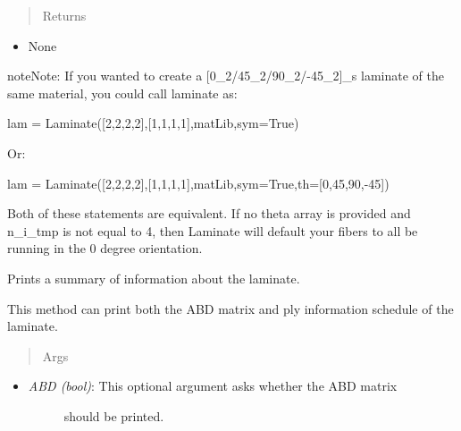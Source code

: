 \documentclass[letterpaper,10pt,english]{sphinxmanual}
\begin{document}
\begin{fulllineitems}
\begin{fulllineitems}
\begin{itemize}
\begin{description}
\end{description}

\end{itemize}
\begin{quote}\begin{description}
\item[{Returns}] \leavevmode
\end{description}\end{quote}
\begin{itemize}
\item {} 
None

\end{itemize}

\begin{notice}{note}{Note:}
If you wanted to create a {[}0\_2/45\_2/90\_2/-45\_2{]}\_s laminate of the
same material, you could call laminate as:

lam = Laminate({[}2,2,2,2{]},{[}1,1,1,1{]},matLib,sym=True)

Or:

lam = Laminate({[}2,2,2,2{]},{[}1,1,1,1{]},matLib,sym=True,th={[}0,45,90,-45{]})

Both of these statements are equivalent. If no theta array is
provided and n\_i\_tmp is not equal to 4, then Laminate will default
your fibers to all be running in the 0 degree orientation.
\end{notice}

\end{fulllineitems}


\begin{fulllineitems}
\label{structures:AeroComBAT.Structures.Laminate.printSummary}
Prints a summary of information about the laminate.

This method can print both the ABD matrix and ply information schedule
of the laminate.
\begin{quote}\begin{description}
\item[{Args}] \leavevmode
\end{description}\end{quote}
\begin{itemize}
\item {} \begin{description}
\item[{\emph{ABD (bool)}: This optional argument asks whether the ABD matrix}] \leavevmode
should be printed.


\end{description}
\end{itemize}
\end{fulllineitems}
\end{fulllineitems}
\end{document}
